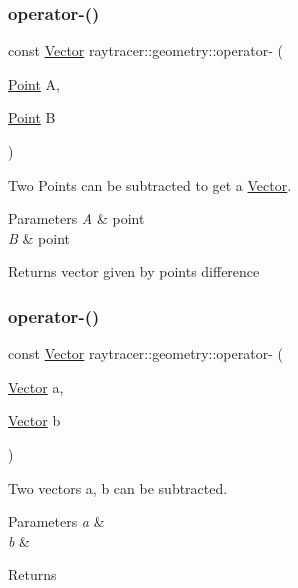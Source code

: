 \subsubsection{\texorpdfstring{operator-\/()}{operator-()}\hspace{0.1cm}{\footnotesize\ttfamily [1/2]}}
{\footnotesize\ttfamily const \hyperlink{classraytracer_1_1geometry_1_1Vector}{Vector} raytracer\+::geometry\+::operator-\/ (\begin{DoxyParamCaption}\item[{\hyperlink{classraytracer_1_1geometry_1_1Point}{Point}}]{A,  }\item[{\hyperlink{classraytracer_1_1geometry_1_1Point}{Point}}]{B }\end{DoxyParamCaption})}



Two Points can be subtracted to get a \hyperlink{classraytracer_1_1geometry_1_1Vector}{Vector}. 


\begin{DoxyParams}{Parameters}
{\em A} & point \\
\hline
{\em B} & point \\
\hline
\end{DoxyParams}
\begin{DoxyReturn}{Returns}
vector given by points difference 
\end{DoxyReturn}
\mbox{\label{namespaceraytracer_1_1geometry_ab04e4d69ac25203a75381e41d6877493}} 
\subsubsection{\texorpdfstring{operator-\/()}{operator-()}\hspace{0.1cm}{\footnotesize\ttfamily [2/2]}}
{\footnotesize\ttfamily const \hyperlink{classraytracer_1_1geometry_1_1Vector}{Vector} raytracer\+::geometry\+::operator-\/ (\begin{DoxyParamCaption}\item[{\hyperlink{classraytracer_1_1geometry_1_1Vector}{Vector}}]{a,  }\item[{\hyperlink{classraytracer_1_1geometry_1_1Vector}{Vector}}]{b }\end{DoxyParamCaption})}



Two vectors a, b can be subtracted. 


\begin{DoxyParams}{Parameters}
{\em a} & \\
\hline
{\em b} & \\
\hline
\end{DoxyParams}
\begin{DoxyReturn}{Returns}

\end{DoxyReturn}

